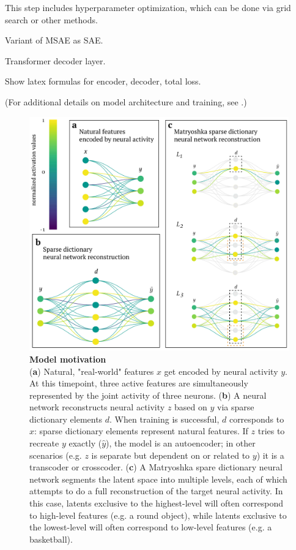 This step includes hyperparameter optimization, which can be done via grid search or other methods. 

Variant of MSAE as SAE. 

Transformer decoder layer. 

Show latex formulas for encoder, decoder, total loss.

(For additional details on model architecture and training, see .)

\begin{figure}[h]
    \begin{minipage}{0.64\linewidth}
    \includegraphics[width=\linewidth]{figures/sdnn_arch.pdf}
    \end{minipage}%
    \begin{minipage}{0.35\linewidth}
    \caption{
        \textbf{Model motivation} \\
        \small
        (\textbf{a}) Natural, "real-world" features $x$ get encoded by neural activity $y$. At this timepoint, three active features are simultaneously represented by the joint activity of three neurons. (\textbf{b}) A neural network reconstructs neural activity $z$ based on $y$ via sparse dictionary elements $d$. When training is successful, $d$ corresponds to $x$: sparse dictionary elements represent natural features. If $z$ tries to recreate $y$ exactly ($\hat{y}$), the model is an autoencoder; in other scenarios (e.g. $z$ is separate but dependent on or related to $y$) it is a transcoder or crosscoder. (\textbf{c}) A Matryoshka spare dictionary neural network segments the latent space into multiple levels, each of which attempts to do a full reconstruction of the target neural activity. In this case, latents exclusive to the highest-level will often correspond to high-level features (e.g. a round object), while latents exclusive to the lowest-level will often correspond to low-level features (e.g. a basketball).
    }
    \label{fig:sdnn_arch}
    \end{minipage}
\end{figure}

